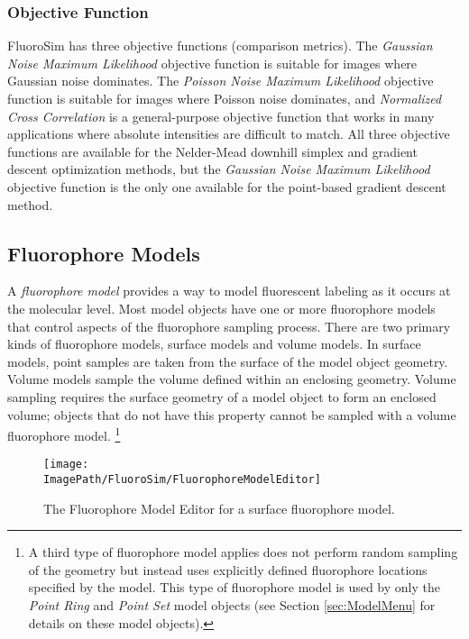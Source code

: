 \documentclass[11pt,titlepage,twoside]{article}
\begin{document}
\subsubsection{Objective Function}

FluoroSim has three objective functions (comparison metrics). The \emph{Gaussian Noise Maximum Likelihood} objective function is suitable for images where Gaussian noise dominates. The \emph{Poisson Noise Maximum Likelihood} objective function is suitable for images where Poisson noise dominates, and \emph{Normalized Cross Correlation} is a general-purpose objective function that works in many applications where absolute intensities are difficult to match. All three objective functions are available for the Nelder-Mead downhill simplex and gradient descent optimization methods, but the \emph{Gaussian Noise Maximum Likelihood} objective function is the only one available for the point-based gradient descent method.

\subsection{Fluorophore Models}
\label{sec:FluorophoreModels}

A \emph{fluorophore model} provides a way to model fluorescent labeling as it occurs at the molecular level. Most model objects have one or more fluorophore models that control aspects of the fluorophore sampling process. There are two primary kinds of fluorophore models, surface models and volume models. In surface models, point samples are taken from the surface of the model object geometry. Volume models sample the volume defined within an enclosing geometry. Volume sampling requires the surface geometry of a model object to form an enclosed volume; objects that do not have this property cannot be sampled with a volume fluorophore model. \footnote{A third type of fluorophore model applies does not perform random sampling of the geometry but instead uses explicitly defined fluorophore locations specified by the model. This type of fluorophore model is used by only the \emph{Point Ring} and \emph{Point Set} model objects (see Section \ref{sec:ModelMenu} for details on these model objects).}

\begin{figure}[htbp] %
   \centering
   \texttt{[image: \\ImagePath/FluoroSim/FluorophoreModelEditor]} 
   \caption{The Fluorophore Model Editor for a surface fluorophore model.}
   \label{fig:FluorophoreModelEditor}
\end{figure}
\end{document}
